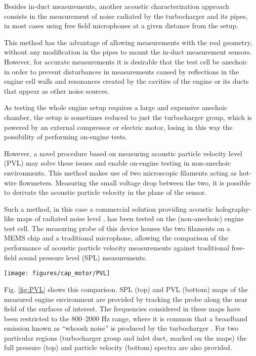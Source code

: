 Besides in-duct measurements, another acoustic characterization approach consists in the measurement of noise radiated by the turbocharger and its pipes, in most cases using free field microphones at a given distance from the setup.

This method has the advantage of allowing measurements with the real geometry, without any modification in the pipes to mount the in-duct measurement sensors. However, for accurate measurements it is desirable that the test cell be anechoic in order to prevent disturbances in measurements caused by reflections in the engine cell walls and resonances created by the cavities of the engine or its ducts that appear as other noise sources.

As testing the whole engine setup requires a large and expensive anechoic chamber, the setup is sometimes reduced to just the turbocharger group, which is powered by an external compressor or electric motor, losing in this way the possibility of performing on-engine tests.

However, a novel procedure based on measuring acoustic particle velocity level (PVL) may solve these issues \cite{jacobsen2005comparison} and enable on-engine testing in non-anechoic environments. This method makes use of two microscopic filaments acting as hot-wire flowmeters. Measuring the small voltage drop between the two, it is possible to derivate the acoustic particle velocity in the plane of the sensor.

Such a method, in this case a commercial solution providing acoustic holography-like maps of radiated noise level \cite{comesana2013scan}, has been tested on the (non-anechoic) engine test cell. The measuring probe of this device houses the two filaments on a MEMS chip and a traditional microphone, allowing the comparison of the performance of acoustic particle velocity measurements against traditional free-field sound pressure level (SPL) measurements.

\begin{figure*}[tb!]
\centering
\texttt{[image: figures/cap\_motor/PVL]}
\caption{Near field noise holograms (800--2000 Hz) obtained through SPL (top) and PVL (bottom), including detail of the spectra of two regions of interest: turbocharger group (blue) and compressor inlet (red).}
\label{fig:PVL}
\end{figure*}

Fig. \ref{fig:PVL} shows this comparison. SPL (top) and PVL (bottom) maps of the measured engine environment are provided by tracking the probe along the near field of the surfaces of interest. The frequencies considered in these maps have been restricted to the 800--2000 Hz range, where it is common that a broadband emission known as ``whoosh noise'' is produced by the turbocharger \cite{evans2005minimizing}. For two particular regions (turbocharger group and inlet duct, marked on the maps) the full pressure (top) and particle velocity (bottom) spectra are also provided.

